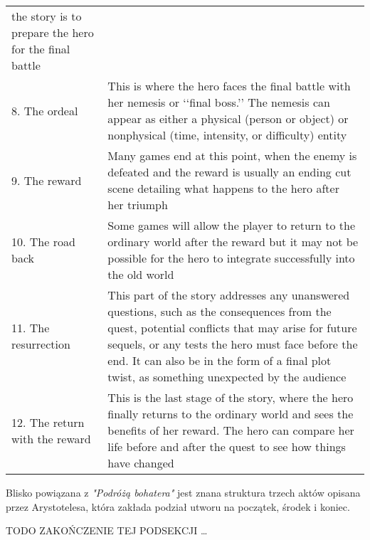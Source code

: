 \begin{table}[h!]
\begin{center}
\begin{tabular}{p{1.5in} p{4in}}
			the story is to prepare the hero for the final battle                                                       \\
			8. The ordeal                         & This is where the hero faces the final battle with her nemesis or
			‘‘final boss.’’ The nemesis can appear as either a physical (person
			or object) or nonphysical (time, intensity, or difficulty) entity                                           \\
			9. The reward                         & Many games end at this point, when the enemy is defeated and
			the reward is usually an ending cut scene detailing what happens
			to the hero after her triumph                                                                               \\
			10. The road back                     & Some games will allow the player to return to the ordinary
			world after the reward but it may not be possible for the hero to
			integrate successfully into the old world                                                                   \\
			11. The resurrection                  & This part of the story addresses any unanswered questions, such
			as the consequences from the quest, potential conflicts that may
			arise for future sequels, or any tests the hero must face before
			the end. It can also be in the form of a final plot twist, as
			something unexpected by the audience                                                                        \\
			12. The return with the reward        & This is the last stage of the story, where the hero finally returns
			to the ordinary world and sees the benefits of her reward. The
			hero can compare her life before and after the quest to see how
			things have changed                                                                                         \\
			\hline
		\end{tabular}
	\end{center}
\end{table}

\newpage

Blisko powiązana z \textit{"Podróżą bohatera"} jest znana struktura trzech aktów opisana przez
Arystotelesa, która zakłada podział utworu na początek, środek i koniec\cite{narrative_structures}.

TODO ZAKOŃCZENIE TEJ PODSEKCJI \ldots

\lipsum[1]

